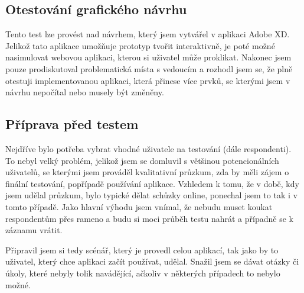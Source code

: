 \subsection{Otestování grafického návrhu}

Tento test lze provést nad návrhem, který jsem vytvářel v aplikaci Adobe XD. Jelikož tato aplikace umožňuje prototyp tvořit interaktivně,
je poté možné nasimulovat webovou aplikaci, kterou si uživatel může proklikat. Nakonec jsem pouze prodiskutoval problematická místa s vedoucím a rozhodl jsem
se, že plně otestuji implementovanou aplikaci, která přinese více prvků, se kterými jsem v návrhu nepočítal nebo musely být změněny.

\subsection{Příprava před testem}

Nejdříve bylo potřeba vybrat vhodné uživatele na testování (dále respondenti). To nebyl velký problém, jelikož jsem se domluvil s většinou potencionálních
uživatelů, se kterými jsem prováděl kvalitativní průzkum, zda by měli zájem o finální testování, popřípadě používání aplikace.
Vzhledem k tomu, že v době, kdy jsem udělal průzkum, bylo typické dělat schůzky online, ponechal jsem to tak i v tomto případě.
Jako hlavní výhodu jsem vnímal, že nebudu muset koukat respondentům přes rameno a budu si moci průběh testu nahrát a případně se
k záznamu vrátit.

Připravil jsem si tedy scénář, který je provedl celou aplikací, tak jako by to uživatel, který chce aplikaci začít používat, udělal.
Snažil jsem se dávat otázky či úkoly, které nebyly tolik navádějící, ačkoliv v některých případech to nebylo možné.

